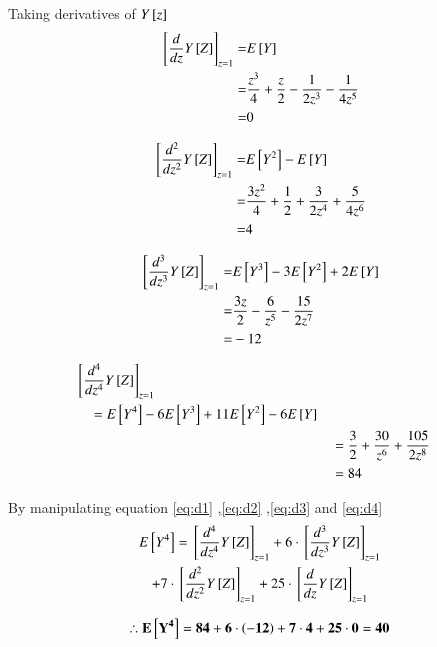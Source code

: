 \documentclass[journal,12pt,twocolumn]{IEEEtran}
\begin{document}
Taking derivatives of $Y{}\left[z\right]$
\begin{align}
    {}\left[\frac{d}{dz}Y{}\left[Z\right]\right]_{z=1} =& E{}\left[Y\right]
    \label{eq:d1}
    \\=&\frac{z^{3}}{4} + \frac{z}{2} - \frac{1}{2 z^{3}} - \frac{1}{4 z^{5}}
    \\=&0
\end{align}    
    
\begin{align}
    {}\left[\frac{d^2}{dz^2}Y{}\left[Z\right]\right]_{z=1} =& E{}\left[Y^2\right]-E{}\left[Y\right]
    \label{eq:d2}
    \\=&\frac{3 z^{2}}{4} + \frac{1}{2} + \frac{3}{2 z^{4}} + \frac{5}{4 z^{6}}
    \\=&4
\end{align}    
    
\begin{align}
     {}\left[\frac{d^3}{dz^3}Y{}\left[Z\right]\right]_{z=1} =& E{}\left[Y^3\right]-3E{}\left[Y^2\right]+2E{}\left[Y\right]
     \label{eq:d3}
     \\=&\frac{3 z}{2} - \frac{6}{z^{5}} - \frac{15}{2 z^{7}}
     \\=&-12
\end{align}     
     
\begin{align}
    \begin{split}
         &{}\left[\frac{d^4}{dz^4}Y{}\left[Z\right]\right]_{z=1} \\&\quad= E{}\left[Y^4\right]-6E{}\left[Y^3\right]+11E{}\left[Y^2\right]-6E{}\left[Y\right]
    \end{split}
    \label{eq:d4}
    \\&\quad=\frac{3}{2} + \frac{30}{z^{6}} + \frac{105}{2 z^{8}}
    \\&\quad=84
\end{align}

By manipulating equation \eqref{eq:d1} ,\eqref{eq:d2} ,\eqref{eq:d3} and \eqref{eq:d4}
\begin{multline}
    E{}\left[Y^4\right]={}\left[\frac{d^4}{dz^4}Y{}\left[Z\right]\right]_{z=1} + 6 \cdot {}\left[\frac{d^3}{dz^3}Y{}\left[Z\right]\right]_{z=1} \\+ 7 \cdot {}\left[\frac{d^2}{dz^2}Y{}\left[Z\right]\right]_{z=1} +25 \cdot {}\left[\frac{d}{dz}Y{}\left[Z\right]\right]_{z=1}
\end{multline}

\begin{align*}
    \mathbf{\therefore E{}\left[Y^4\right]=84+6\cdot\left(-12\right)+7\cdot4+25\cdot0=40}
\end{align*}
\end{document}
